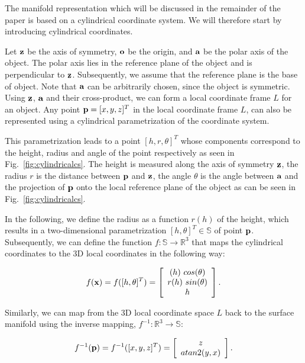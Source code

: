 \documentclass{aamas2015}
\begin{document}
The manifold representation which will be discussed in the remainder of the paper is based on a
cylindrical coordinate system. We will therefore start by introducing cylindrical coordinates. 

 
Let $\textbf{z}$ be the axis of symmetry, $\textbf{o}$ be the origin, and $\textbf{a}$ be the polar axis
of the object. The polar axis lies in the reference plane of the object and is perpendicular to
$\textbf{z}$. Subsequently, we assume that the reference plane is the base of object. Note that
$\textbf{a}$ can be arbitrarily chosen, since the object is symmetric. Using $\textbf{z}$, $\textbf{a}$
and their cross-product, we can form a local coordinate frame $L$ for an object. Any point $\textbf{p} =
[x,y,z]^T$ in the local coordinate frame $L$, can also be represented using a cylindrical
parametrization of the coordinate system. 

This parametrization leads to a point $[h, r, \theta]^T$ whose components correspond to the height,
radius and angle of the point respectively as seen in Fig.~\ref{fig:cylindricalcs}. The height is
measured along the axis of symmetry $\textbf{z}$, the radius $r$ is the distance between $\textbf{p}$
and $\textbf{z}$, the angle $\theta$ is the angle between $\textbf{a}$ and the projection of $\textbf{p} $
onto the local reference plane of the object as can be seen in Fig.~\ref{fig:cylindricalcs}.

In the following, we define the radius as a function $r(h)$ of the height, which results in a
two-dimensional parametrization $[h, \theta]^T \in \mathbb{S}$ of point $\textbf{p}$. Subsequently, we
can define the function $f: \mathbb{S} \rightarrow \mathbb{R}^3$ that maps the cylindrical
coordinates to the 3D local coordinates in the following way:

\begin{equation}
  f(\textbf{x}) = f([h, \theta]^T) = \left[ 
  \begin{array}{c}
  (h) ~ cos(\theta) \\ r(h) ~ sin(\theta)\\ h 
  \end{array} \right]. 
\end{equation}

Similarly, we can map from the 3D local coordinate space $L$ back to the surface manifold using the
inverse mapping, $f^{-1}: \mathbb{R}^3 \rightarrow \mathbb{S}$:

\begin{equation}
  f^{-1}(\textbf{p}) = f^{-1}([x,y,z]^T) = \left[ \begin{array}{c} z \\ atan2(y,x) \end{array}\right].
\end{equation}
\end{document}
